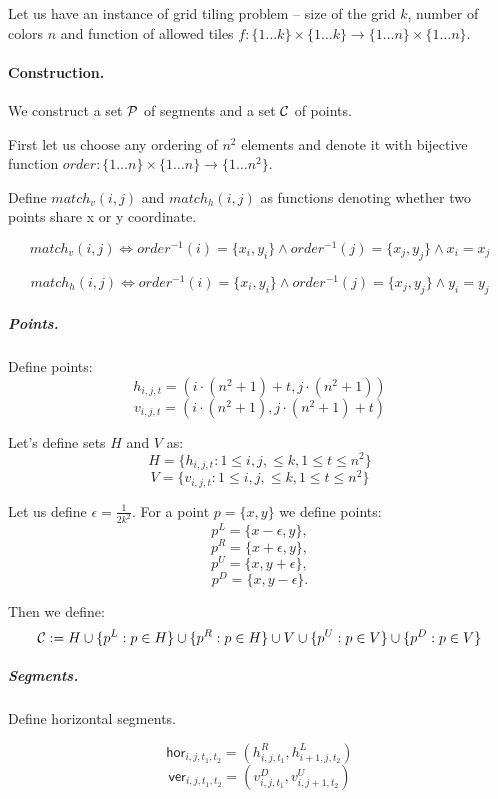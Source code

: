 Let us have an instance of grid tiling problem -- size of the
grid $k$, number of colors $n$
and function of allowed tiles
$f : \{1 \ldots k\} \times \{1 \ldots k\} \rightarrow \{1 \ldots n\} \times \{1 \ldots n\}$.

\paragraph{Construction.}
We construct a set $\mathcal{P}$ of segments and a set $\mathcal{C}$
of points.

First let us choose any ordering of $n^2$ elements
and denote it with bijective function
$order : \{1 \ldots n\} \times \{1 \ldots n\} \rightarrow \{1 \ldots n^2\}$.

Define $match_v(i, j)$ and $match_h(i, j)$
as functions denoting whether two points share x or y coordinate.

$$match_v(i, j) \iff
order^{-1}(i) = \{x_i, y_i\} \land order^{-1}(j) = \{x_j, y_j\} \land x_i = x_j$$

$$match_h(i, j) \iff
order^{-1}(i) = \{x_i, y_i\} \land order^{-1}(j) = \{x_j, y_j\} \land y_i = y_j$$


\subparagraph{Points.}

Define points:
	$$h_{i, j, t} = (i \cdot (n^2+1) + t, j \cdot (n^2+1))$$
	$$v_{i, j, t} = (i \cdot (n^2+1), j \cdot (n^2+1) + t)$$
	
Let's define sets $H$ and $V$ as:
$$H = \{h_{i, j, t} : 1 \le i, j, \le k, 1 \le t \le n^2\}$$
$$V = \{v_{i, j, t} : 1 \le i, j, \le k, 1 \le t \le n^2\}$$
	
Let us define $\epsilon = \frac{1}{2k^2}$.
For a point $p = \{x, y\}$ we define points:
$$p^{L} = \{x - \epsilon, y\},$$
$$p^{R} = \{x + \epsilon, y\},$$
$$p^{U} = \{x, y + \epsilon\},$$
$$p^{D} = \{x, y - \epsilon\}.$$

Then we define:
$$\mathcal{C} := H \cup \{p^L : p \in H\} \cup \{p^R : p \in H\}
\cup V \cup \{p^U : p \in V\} \cup \{p^D : p \in V\} $$


\subparagraph{Segments.}
Define horizontal segments.

\newcommand{\hor}[4]{\mathsf{hor}_{#1,#2,#3,#4}}
\newcommand{\ver}[4]{\mathsf{ver}_{#1,#2,#3,#4}}
\newcommand{\horbeg}[2]{\mathsf{horBeg}_{#1,#2}}
\newcommand{\verbeg}[2]{\mathsf{verBeg}_{#1,#2}}
\newcommand{\horend}[2]{\mathsf{horEnd}_{#1,#2}}
\newcommand{\verend}[2]{\mathsf{verEnd}_{#1,#2}}

$$\hor{i}{j}{t_1}{t_2} = (h^R_{i,j,t_1}, h^L_{i+1, j, t_2})$$
$$\ver{i}{j}{t_1}{t_2} = (v^D_{i,j,t_1}, v^U_{i, j+1, t_2})$$

